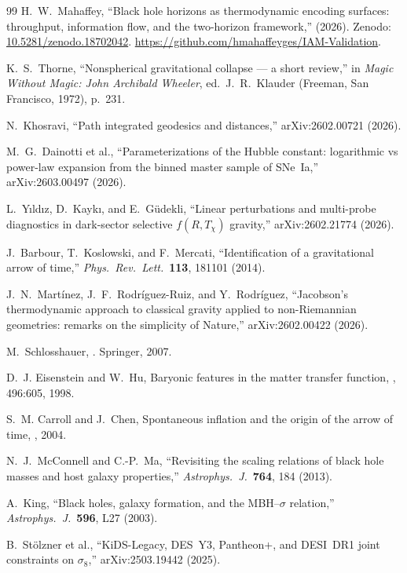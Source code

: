 \documentclass[twocolumn,a4paper,aps,prd,twocolumn,showpacs,notitlepage,superscriptaddress,nofootinbib]{article}
\begin{document}
\begin{thebibliography}{99}
H.~W.~Mahaffey,
``Black hole horizons as thermodynamic encoding surfaces: throughput,
information flow, and the two-horizon framework,'' (2026).
Zenodo: \href{https://doi.org/10.5281/zenodo.18702042}{10.5281/zenodo.18702042}.
\url{https://github.com/hmahaffeyges/IAM-Validation}.

K.~S.~Thorne,
``Nonspherical gravitational collapse --- a short review,''
in \textit{Magic Without Magic: John Archibald Wheeler},
ed.\ J.~R.~Klauder (Freeman, San Francisco, 1972), p.~231.

N.~Khosravi,
``Path integrated geodesics and distances,''
arXiv:2602.00721 (2026).

M.~G.~Dainotti et al.,
``Parameterizations of the Hubble constant: logarithmic vs power-law
expansion from the binned master sample of SNe~Ia,''
arXiv:2603.00497 (2026).

L.~Y{\i}ld{\i}z, D.~Kayk{\i}, and E.~G\"{u}dekli,
``Linear perturbations and multi-probe diagnostics in dark-sector selective
$f(R,T_\chi)$ gravity,''
arXiv:2602.21774 (2026).

J.~Barbour, T.~Koslowski, and F.~Mercati,
``Identification of a gravitational arrow of time,''
\textit{Phys.\ Rev.\ Lett.}\ \textbf{113}, 181101 (2014).

J.~N.~Mart\'inez, J.~F.~Rodr\'iguez-Ruiz, and Y.~Rodr\'iguez,
``Jacobson's thermodynamic approach to classical gravity applied to
non-Riemannian geometries: remarks on the simplicity of Nature,''
arXiv:2602.00422 (2026).

M.~Schlosshauer,
.
\newblock Springer, 2007.

D.~J. Eisenstein and W.~Hu,
\newblock Baryonic features in the matter transfer function,
, 496:605, 1998.

S.~M. Carroll and J.~Chen,
\newblock Spontaneous inflation and the origin of the arrow of time,
, 2004.


N.~J.~McConnell and C.-P.~Ma,
``Revisiting the scaling relations of black hole masses and host galaxy properties,''
\textit{Astrophys.\ J.}\ \textbf{764}, 184 (2013).

A.~King,
``Black holes, galaxy formation, and the {MBH}--$\sigma$ relation,''
\textit{Astrophys.\ J.}\ \textbf{596}, L27 (2003).

B.~St\"olzner et al.,
``KiDS-Legacy, DES~Y3, Pantheon+, and DESI~DR1 joint constraints on
$\sigma_8$,''
arXiv:2503.19442 (2025).

\end{thebibliography}
\end{document}
